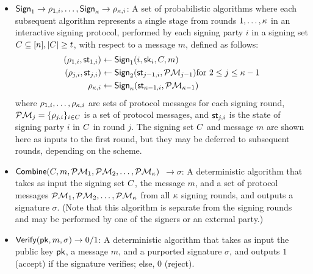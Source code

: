 \begin{definition}
\begin{itemize}
  \item $\mathsf{Sign}_1 \rightarrow \rho_{1, i},  \ldots,
    \mathsf{Sign}_\kappa \rightarrow \rho_{ \kappa, i}$:
    A set of probabilistic algorithms where each subsequent algorithm represents a single stage
    from rounds $1, \ldots, \kappa$ in an interactive signing protocol,
    performed by each signing party $i$ in a signing set
    $C \subseteq [n], |C| \geq t$,
    with respect to a message $m$, defined as follows:
  \begin{align}\label{eqn:protocol-messages}
    \begin{split}
    (\rho_{1,i}, \mathsf{st}_{1,i}) &\gets \mathsf{Sign}_1(i, \mathsf{sk}_i, C, m)   \\
    (\rho_{j,i}, \mathsf{st}_{j,i}) &\gets \mathsf{Sign}_2(\mathsf{st}_{j-1,i}, \mathcal{PM}_{j-1}) \text{for } 2 \leq j \leq \kappa-1   \\
    \rho_{\kappa, i} &\gets \mathsf{Sign}_\kappa(\mathsf{st}_{\kappa-1,i}, \mathcal{PM}_{\kappa-1}) \\
    \end{split}
  \end{align}
    where $\rho_{ 1, i}, \ldots, \rho_{\kappa, i}$ are sets of protocol messages for each signing round,
    $\mathcal{PM}_j = \{ \rho_{j, i} \}_{i \in C} $ is a set of protocol messages,
    and $\mathsf{st}_{j,i}$ is the state of signing party $i$ in $C$ in round $j$.
  The signing set $C$ and message $m$ are shown here as inputs to the first round,
  but they may be deferred to subsequent rounds,
  depending on the scheme.

\item $\mathsf{Combine}(C, m, \mathcal{PM}_1, \mathcal{PM}_2, \dots, \mathcal{PM}_\kappa)$ $\rightarrow \sigma$:\newline
  A deterministic algorithm that takes as input the signing set $C$, the message $m$,
  and a set of protocol messages $\mathcal{PM}_1, \mathcal{PM}_2, \dots, \mathcal{PM}_\kappa$ from all $\kappa$ signing rounds,
  and outputs a signature $\sigma$.
  (Note that this algorithm is separate from the signing rounds
  and may be performed by one of the signers or an external party.)

  \item $\mathsf{Verify}(\mathsf{pk}, m, \sigma) \rightarrow 0/1$:
  A deterministic algorithm that takes as input the public key $\mathsf{pk}$,
  a message $m$, and a purported signature $\sigma$,
  and outputs $1$ (accept) if the signature verifies; else, $0$ (reject).

\end{itemize}
\end{definition}

